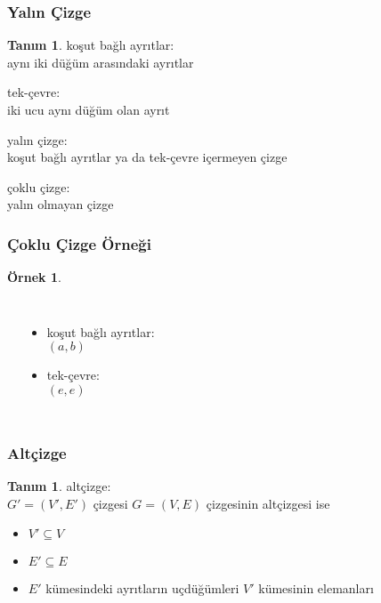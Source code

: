 \documentclass[dvipsnames]{beamer}
\theoremstyle{definition}
\newtheorem{tanim}[theorem]{Tanım}
\theoremstyle{example}
\newtheorem{ornek}[theorem]{Örnek}
\theoremstyle{plain}
\begin{document}
\begin{frame}
  \frametitle{Yalın Çizge}

  \begin{tanim}
    \alert{koşut bağlı ayrıtlar}:\\
    aynı iki düğüm arasındaki ayrıtlar

    \pause
    \bigskip
    \alert{tek-çevre}:\\
    iki ucu aynı düğüm olan ayrıt

    \pause
    \bigskip
    \alert{yalın çizge}:\\
    koşut bağlı ayrıtlar ya da tek-çevre içermeyen çizge

    \pause
    \bigskip
    \alert{çoklu çizge}:\\
    yalın olmayan çizge
  \end{tanim}
\end{frame}

\begin{frame}
  \frametitle{Çoklu Çizge Örneği}

  \begin{ornek}
    \begin{columns}
      \begin{center}
      \end{center}

      \begin{itemize}
        \item koşut bağlı ayrıtlar:\\
          $(a,b)$
        \item tek-çevre:\\
          $(e,e)$
      \end{itemize}
    \end{columns}
  \end{ornek}
\end{frame}

\begin{frame}
  \frametitle{Altçizge}

  \begin{tanim}
    \alert{altçizge}:\\
      $G'=(V',E')$ çizgesi $G=(V,E)$ çizgesinin altçizgesi ise

    \begin{itemize}
      \item $V' \subseteq V$
      \item $E' \subseteq E$
      \item $E'$ kümesindeki ayrıtların uçdüğümleri $V'$ kümesinin elemanları
    \end{itemize}
  \end{tanim}
\end{frame}
\end{document}
